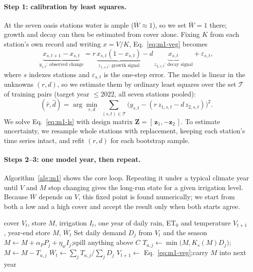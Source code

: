 \paragraph{Step 1: calibration by least squares.} At the seven oasis stations water is ample ($\overline W\approx1$), so we set $\overline W=1$ there; growth and decay can then be estimated from cover alone. Fixing $K$ from each station's own record and writing $x=V/K$, Eq.~\eqref{eq:m1-veg} becomes
\begin{equation}\label{eq:m1-reg}
\underbrace{x_{s,t+1}-x_{s,t}}_{y_{s,t}:\ \text{observed change}}=r\,\underbrace{x_{s,t}(1-x_{s,t})}_{z_{1,s,t}:\ \text{growth signal}}-d\,\underbrace{x_{s,t}}_{z_{2,s,t}:\ \text{decay signal}}+\varepsilon_{s,t},
\end{equation}
where $s$ indexes stations and $\varepsilon_{s,t}$ is the one-step error. The model is linear in the unknowns $(r,d)$, so we estimate them by ordinary least squares over the set $\mathcal T$ of training pairs (target year $\le2022$, all seven stations pooled):
\begin{equation}\label{eq:m1-ls}
(\hat r,\hat d)=\arg\min_{r,d}\ \sum_{(s,t)\in\mathcal T}\big(y_{s,t}-(r\,z_{1,s,t}-d\,z_{2,s,t})\big)^2 .
\end{equation}
We solve Eq.~\eqref{eq:m1-ls} with design matrix $\bm Z=[\,\bm z_1,-\bm z_2\,]$. To estimate uncertainty, we resample whole stations with replacement, keeping each station's time series intact, and refit $(r,d)$ for each bootstrap sample.

\paragraph{Steps 2--3: one model year, then repeat.} Algorithm~\ref{alg:m1} shows the core loop. Repeating it under a typical climate year until $V$ and $M$ stop changing gives the long-run state for a given irrigation level. Because $\overline W$ depends on $V$, this fixed point is found numerically; we start from both a low and a high cover and accept the result only when both starts agree.

\begin{algorithm}[H]
\caption{One model year: the water store drives cover}\label{alg:m1}
\begin{algorithmic}[1]
\Require cover $V_t$, store $M$, irrigation $I_t$, one year of daily rain, ET$_0$ and temperature
\Ensure $V_{t+1}$, year-end store $M$, $\overline W_t$
\State Set daily demand $D_j$ from $V_t$ and the season 
  \State $M\gets M+\alpha_PP_j+\eta_wI_j$;\quad spill anything above $C$ 
  \State $T_{a,j}\gets\min\big(M,K_s(M)D_j\big)$;\quad $M\gets M-T_{a,j}$ 
\EndFor
\State $\overline W_t\gets\sum_jT_{a,j}/\sum_jD_j$ 
\State $V_{t+1}\gets$ Eq.~\eqref{eq:m1-veg};\quad carry $M$ into next year
\end{algorithmic}
\end{algorithm}

